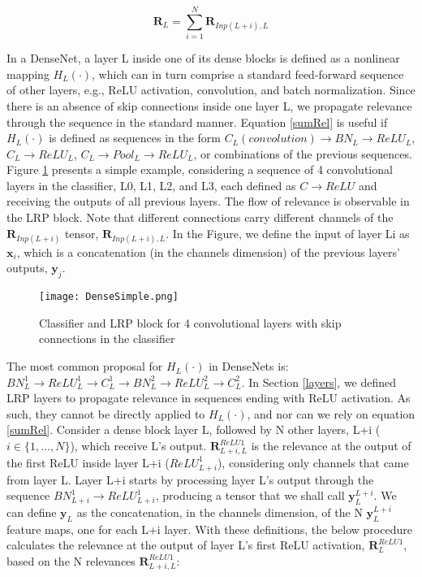 \documentclass[fleqn,10pt]{wlscirep}
\begin{document}
{\begin{equation}
\bm{R}_{L}=\sum_{i=1}^{N}\bm{R}_{Inp(L+i),L}
\label{sumRel}
\end{equation}

In a DenseNet, a layer L inside one of its dense blocks is defined as a nonlinear mapping $H_{L}(\cdot)$, which can in turn comprise a standard feed-forward sequence of other layers, e.g., ReLU activation, convolution, and batch normalization. Since there is an absence of skip connections inside one layer L, we propagate relevance through the sequence in the standard manner. Equation \ref{sumRel} is useful if $H_{L}(\cdot)$ is defined as sequences in the form $C_{L}(convolution) \rightarrow BN_{L} \rightarrow ReLU_{L}$, $C_{L} \rightarrow ReLU_{L}$, $C_{L} \rightarrow Pool_{L} \rightarrow ReLU_{L}$, or combinations of the previous sequences. Figure \ref{SimpleDense} presents a simple example, considering a sequence of 4 convolutional layers in the classifier, L0, L1, L2, and L3, each defined as $C \rightarrow ReLU$ and receiving the outputs of all previous layers. The flow of relevance is observable in the LRP block. Note that different connections carry different channels of the $\bm{R}_{Inp(L+i)}$ tensor, $\bm{R}_{Inp(L+i),L}$. In the Figure, we define the input of layer Li as $\bm{x}_{i}$, which is a concatenation (in the channels dimension) of the previous layers' outputs, $\bm{y}_{j}$.

\begin{figure}[h]
\texttt{[image: DenseSimple.png]}
\centering
\caption{Classifier and LRP block for 4 convolutional layers with skip connections in the classifier}
\label{SimpleDense}
\end{figure}

The most common proposal for $H_{L}(\cdot)$ in DenseNets is: $BN^{1}_{L} \rightarrow ReLU^{1}_{L} \rightarrow C^{1}_{L} \rightarrow BN^{2}_{L} \rightarrow ReLU^{2}_{L} \rightarrow C^{2}_{L}$. In Section \ref{layers}, we defined LRP layers to propagate relevance in sequences ending with ReLU activation. As such, they cannot be directly applied to $H_{L}(\cdot)$, and nor can we rely on equation \ref{sumRel}. Consider a dense block layer L, followed by N other layers, L+i ($i \in \{1,...,N\}$), which receive L's output. $\bm{R}_{L+i,L}^{ReLU1}$ is the relevance at the output of the first ReLU inside layer L+i ($ReLU^{1}_{L+i}$), considering only channels that came from layer L. Layer L+i starts by processing layer L's output through the sequence $BN^{1}_{L+i} \rightarrow ReLU^{1}_{L+i}$, producing a tensor that we shall call $\bm{y}_{L}^{L+i}$. We can define $\bm{y}_{L}$ as the concatenation, in the channels dimension, of the N $\bm{y}_{L}^{L+i}$ feature maps, one for each L+i layer. With these definitions, the below procedure calculates the relevance at the output of layer L's first ReLU activation, $\bm{R}_{L}^{ReLU1}$, based on the N relevances $\bm{R}_{L+i,L}^{ReLU1}$:

}
\end{document}
